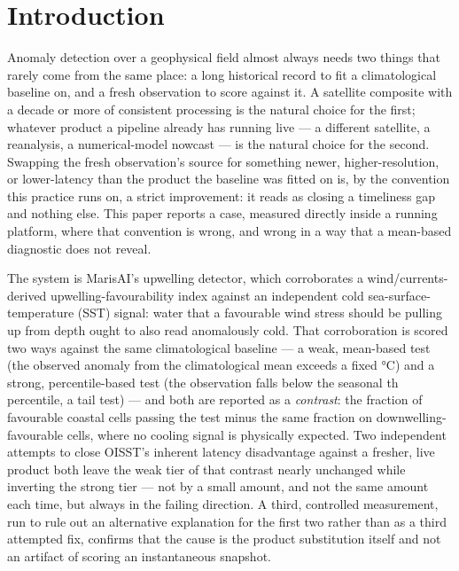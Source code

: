 %

\section{Introduction}

Anomaly detection over a geophysical field almost always needs two things
that rarely come from the same place: a long historical record to fit a
climatological baseline on, and a fresh observation to score against it. A
satellite composite with a decade or more of consistent processing is the
natural choice for the first; whatever product a pipeline already has running
live --- a different satellite, a reanalysis, a numerical-model nowcast --- is
the natural choice for the second. Swapping the fresh observation's source
for something newer, higher-resolution, or lower-latency than the product the
baseline was fitted on is, by the convention this practice runs on, a strict
improvement: it reads as closing a timeliness gap and nothing else. This
paper reports a case, measured directly inside a running platform, where that
convention is wrong, and wrong in a way that a mean-based diagnostic does not
reveal.

The system is MarisAI's upwelling detector, which corroborates a
wind/currents-derived upwelling-favourability index against an independent
cold sea-surface-temperature (SST) signal: water that a favourable wind
stress should be pulling up from depth ought to also read anomalously cold.
That corroboration is scored two ways against the same climatological
baseline --- a weak, mean-based test (the observed anomaly from the
climatological mean exceeds a fixed \CoolAnomalyThreshold{}\si{\celsius}) and
a strong, percentile-based test (the observation falls below the seasonal
\ClimPercentile{}th percentile, a tail test) --- and both are reported as a
\emph{contrast}: the fraction of favourable coastal cells passing the test
minus the same fraction on downwelling-favourable cells, where no cooling
signal is physically expected. Two independent attempts to close OISST's
inherent latency disadvantage against a fresher, live product both leave the
weak tier of that contrast nearly unchanged while inverting the strong tier
--- not by a small amount, and not the same amount each time, but always in
the failing direction. A third, controlled measurement, run to rule out an
alternative explanation for the first two rather than as a third attempted
fix, confirms that the cause is the product substitution itself and not an
artifact of scoring an instantaneous snapshot.

